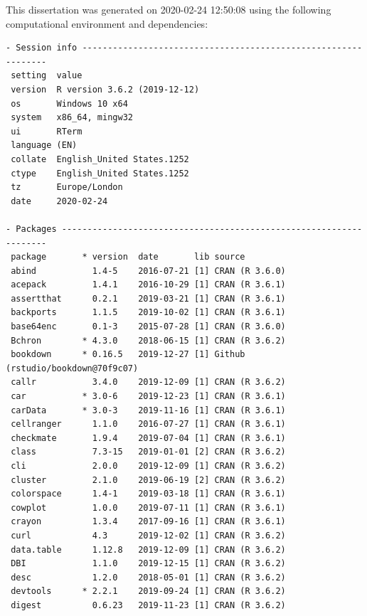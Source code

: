 \documentclass[12pt,twoside]{reedthesis}
\begin{document}
This dissertation was generated on 2020-02-24 12:50:08 using the following computational environment and dependencies:
\begin{verbatim}
- Session info ---------------------------------------------------------------
 setting  value                       
 version  R version 3.6.2 (2019-12-12)
 os       Windows 10 x64              
 system   x86_64, mingw32             
 ui       RTerm                       
 language (EN)                        
 collate  English_United States.1252  
 ctype    English_United States.1252  
 tz       Europe/London               
 date     2020-02-24                  

- Packages -------------------------------------------------------------------
 package       * version  date       lib source                            
 abind           1.4-5    2016-07-21 [1] CRAN (R 3.6.0)                    
 acepack         1.4.1    2016-10-29 [1] CRAN (R 3.6.1)                    
 assertthat      0.2.1    2019-03-21 [1] CRAN (R 3.6.1)                    
 backports       1.1.5    2019-10-02 [1] CRAN (R 3.6.1)                    
 base64enc       0.1-3    2015-07-28 [1] CRAN (R 3.6.0)                    
 Bchron        * 4.3.0    2018-06-15 [1] CRAN (R 3.6.2)                    
 bookdown      * 0.16.5   2019-12-27 [1] Github (rstudio/bookdown@70f9c07) 
 callr           3.4.0    2019-12-09 [1] CRAN (R 3.6.2)                    
 car           * 3.0-6    2019-12-23 [1] CRAN (R 3.6.1)                    
 carData       * 3.0-3    2019-11-16 [1] CRAN (R 3.6.1)                    
 cellranger      1.1.0    2016-07-27 [1] CRAN (R 3.6.1)                    
 checkmate       1.9.4    2019-07-04 [1] CRAN (R 3.6.1)                    
 class           7.3-15   2019-01-01 [2] CRAN (R 3.6.2)                    
 cli             2.0.0    2019-12-09 [1] CRAN (R 3.6.2)                    
 cluster         2.1.0    2019-06-19 [2] CRAN (R 3.6.2)                    
 colorspace      1.4-1    2019-03-18 [1] CRAN (R 3.6.1)                    
 cowplot         1.0.0    2019-07-11 [1] CRAN (R 3.6.1)                    
 crayon          1.3.4    2017-09-16 [1] CRAN (R 3.6.1)                    
 curl            4.3      2019-12-02 [1] CRAN (R 3.6.2)                    
 data.table      1.12.8   2019-12-09 [1] CRAN (R 3.6.2)                    
 DBI             1.1.0    2019-12-15 [1] CRAN (R 3.6.2)                    
 desc            1.2.0    2018-05-01 [1] CRAN (R 3.6.2)                    
 devtools      * 2.2.1    2019-09-24 [1] CRAN (R 3.6.2)                    
 digest          0.6.23   2019-11-23 [1] CRAN (R 3.6.2)                    

\end{verbatim}
\end{document}
